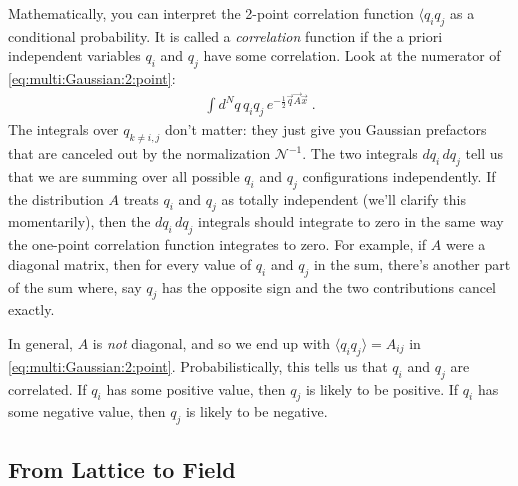 Mathematically, you can interpret the 2-point correlation function $\langle q_i q_j$ as a conditional probability. It is called a \emph{correlation} function if the a priori independent variables $q_i$ and $q_j$ have some correlation. Look at the numerator of \eqref{eq:multi:Gaussian:2:point}:
\begin{align}
	\int d^Nq\, q_iq_j\, e^{-\frac{1}{2} \vec{q}\vec{A}\vec{x}} \ .
\end{align}
The integrals over $q_{k\neq i, j}$ don't matter: they just give you Gaussian prefactors that are canceled out by the normalization $\mathcal N^{-1}$. The two integrals $dq_i\, dq_j$ tell us that we are summing over all possible $q_i$ and $q_j$ configurations independently. If the distribution $A$ treats $q_i$ and $q_j$ as totally independent (we'll clarify this momentarily), then the $dq_i\, dq_j$ integrals should integrate to zero in the same way the one-point correlation function integrates to zero. For example, if $A$ were a diagonal matrix, then for every value of $q_i$ and $q_j$ in the sum, there's another part of the sum where, say $q_j$ has the opposite sign and the two contributions cancel exactly. 

In general, $A$ is \emph{not} diagonal, and so we end up with $\langle q_i q_j\rangle = A_{ij}$ in \eqref{eq:multi:Gaussian:2:point}. Probabilistically, this tells us that $q_i$ and $q_j$ are correlated. If $q_i$ has some positive value, then $q_j$ is likely to be positive. If $q_i$ has some negative value, then $q_j$ is likely to be negative. 

\subsection{From Lattice to Field} %


